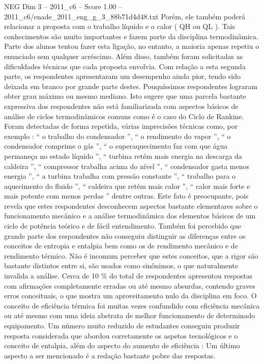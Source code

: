\begin{textsample}{NEG Dim 3 – 2011\_c6 – Score 1.00 – 2011\_c6/enade\_2011\_eng\_g\_3\_88b71d4d48.txt}
Porém, ele também poderá relacionar a proposta com o trabalho líquido e o calor ( QH ou QL ).
Tais conhecimentos são muito importantes e fazem parte da disciplina termodinâmica.
Parte dos alunos tentou fazer esta ligação, no entanto, a maioria apenas repetiu o enunciado sem qualquer acréscimo.
Além disso, também foram solicitadas as dificuldades técnicas que cada proposta envolvia.
Com relação a esta segunda parte, os respondentes apresentaram um desempenho ainda pior, tendo sido deixada em branco por grande parte destes.
Pouquíssimos respondentes lograram obter grau máximo ou mesmo mediano.
Isto sugere que uma parcela bastante expressiva dos respondentes não está familiarizada com aspectos básicos de análise de ciclos termodinâmicos comuns como é o caso do Ciclo de Rankine.
Foram detectadas de forma repetida, várias imprecisões técnicas como, por exemplo : “ o trabalho do condensador ”, “ o rendimento do vapor ”, “ o condensador comprime o gás ”, “ o superaquecimento faz com que água permaneça no estado líquido ”, “ turbina retém mais energia na descarga da caldeira ”, “ compressor trabalha acima do nível ”, “ condensador gasta menos energia ”, “ a turbina trabalha com pressão constante ”, “ trabalho para o aquecimento do fluido ”, “ caldeira que retém mais calor ”, “ calor mais forte e mais potente com menos perdas ” dentre outras.
Este fato é preocupante, pois revela que estes respondentes desconhecem aspectos bastante elementares sobre o funcionamento mecânico e a análise termodinâmica dos elementos básicos de um ciclo de potência teórico e de fácil entendimento.
Também foi percebido que grande parte dos respondentes não conseguiu distinguir as diferenças entre os conceitos de entropia e entalpia bem como os de rendimento mecânico e de rendimento térmico.
Não é incomum perceber que estes conceitos, que a rigor são bastante distintos entre si, são usados como sinônimos, o que naturalmente invalida a análise.
Cerca de 10 \% do total de respondentes apresentou respostas com afirmações completamente erradas ou até mesmo absurdas, contendo graves erros conceituais, o que mostra um aproveitamento nulo da disciplina em foco.
O conceito de eficiência térmica foi muitas vezes confundido com eficiência mecânica ou até mesmo com uma ideia abstrata de melhor funcionamento de determinado equipamento.
Um número muito reduzido de estudantes conseguiu produzir resposta considerada que abordou corretamente os aspetos tecnológicos e o conceito de entalpia, além do aspecto do aumento de eficiência : Um último aspecto a ser mencionado é a redação bastante pobre das respostas.

\end{textsample}
